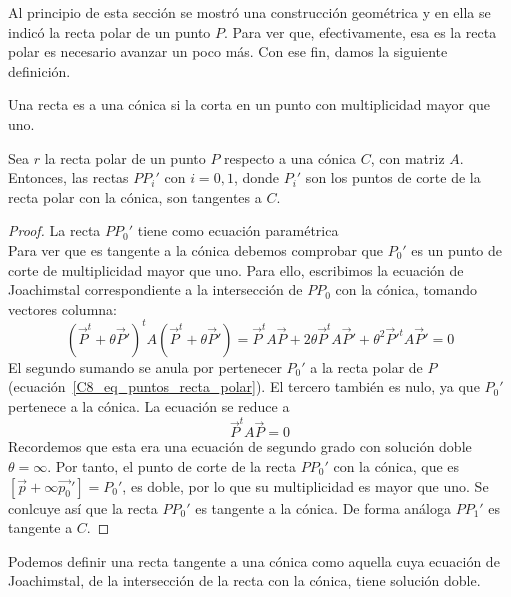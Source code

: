 Al principio de esta sección se mostró una construcción geométrica y en ella se indicó la recta polar de un punto $P$. Para ver que, efectivamente, esa es la recta polar es necesario avanzar un poco más. Con ese fin, damos la siguiente definición.

\begin{defi}
	Una recta es  a una cónica si la corta en un punto con multiplicidad mayor que uno.
\end{defi}
\begin{lem}
	Sea $r$ la recta polar de un punto $P$ respecto a una cónica $C$, con matriz $A$. Entonces, las rectas $PP_i'$ con $i=0,1$, donde $P_i'$ son los puntos de corte de la recta polar con la cónica, son tangentes a $C$.
\end{lem}
\begin{proof}
	La recta $PP_0'$ tiene como ecuación paramétrica
	\begin{equation*}
		[\vec{p}+\theta\vec{p_0}']
	\end{equation*}
	Para ver que es tangente a la cónica debemos comprobar que $P_0'$ es un punto de corte de multiplicidad mayor que uno. Para ello, escribimos la ecuación de Joachimstal correspondiente a la intersección de $PP_0$ con la cónica, tomando vectores columna:
	\begin{equation}
	(\vec{P}^t+\theta \vec{P}')^tA(\vec{P}^t+\theta \vec{P}')=\vec{P}^tA\vec{P}+2\theta \vec{P}^tA\vec{P}'+\theta^2\vec{P}'^tA\vec{P}'=0
	\end{equation}
	El segundo sumando se anula por pertenecer $P_0'$ a la recta polar de $P$ (ecuación~\eqref{C8_eq_puntos_recta_polar}). El tercero también es nulo, ya que $P_0'$ pertenece a la cónica. La ecuación se reduce a 
	\begin{equation}
	\vec{P}^tA\vec{P}=0
	\end{equation}
	Recordemos que esta era una ecuación de segundo grado con solución doble $\theta=\infty$. Por tanto, el punto de corte de la recta $PP_0'$ con la cónica, que es $[\vec{p}+\infty\vec{p_0}']=P_0'$, es doble, por lo que su multiplicidad es mayor que uno. Se conlcuye así que la recta $PP_0'$ es tangente a la cónica. De forma análoga $PP_1'$ es tangente a $C$.
\end{proof}

\begin{obs}
	Podemos definir una recta tangente a una cónica como aquella cuya ecuación de Joachimstal, de la intersección de la recta con la cónica, tiene solución doble.
\end{obs}

